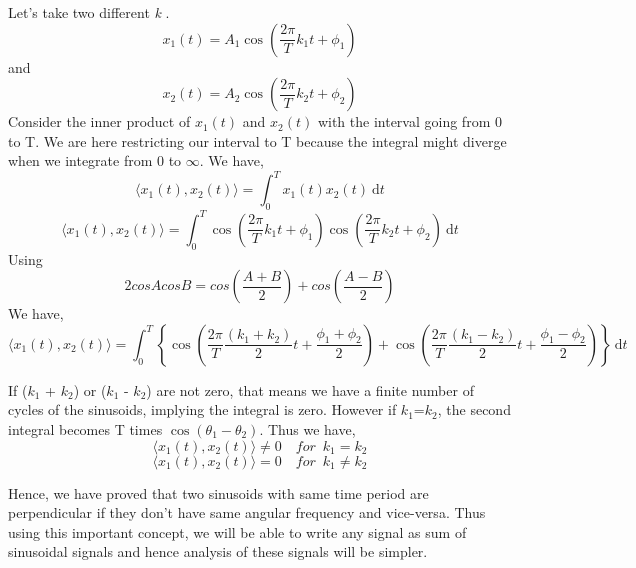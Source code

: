           Let's take two different \textit{k}
.  \begin{equation*}
x_1 (t) = A_1 \cos (\frac{2\pi}{T}k_1t + \phi_1)
\end{equation*}
           and \begin{equation*}
x_2 (t) = A_2 \cos (\frac{2\pi}{T}k_2t + \phi_2)
\end{equation*}
          Consider the inner product of $x_1(t)$ and $x_2(t)$ with the interval going from 0 to T. We are here restricting our interval to T because the integral might diverge when we integrate from 0 to $\infty$. We have,
           \begin{equation*}\langle x_1(t),x_2(t) \rangle = \int_{0}^{T} \! x_1(t)x_2(t) \ \mathrm{d}t\end{equation*}
           \begin{equation*}\langle x_1 (t),x_2 (t) \rangle = \int_{0}^{T} \! \cos (\frac{2\pi}{T}k_1t + \phi_1) \cos (\frac{2\pi}{T}k_2t + \phi_2) \ \mathrm{d}t\end{equation*}
           Using 
          \begin{equation*} 2cosAcosB = cos(\frac{A+B}{2}) + cos(\frac{A-B}{2})\end{equation*}
          We have,
          \begin{equation*}\langle x_1 (t),x_2 (t) \rangle = \int_{0}^{T} \! \left\lbrace \cos (\frac{2\pi}{T}\frac{(k_1+k_2)}{2}t + \frac{\phi_1+\phi_2}{2}) + \cos (\frac{2\pi}{T}\frac{(k_1-k_2)}{2}t + \frac{\phi_1-\phi_2}{2}) \right\rbrace \ \mathrm{d}t \end{equation*}
          
          
        
        
                
                If ($k_1$ + $k_2$) or ($k_1$ - $k_2$) are not zero, that means we have a finite number of cycles of the sinusoids, implying the integral is zero. However if $k_1$=$k_2$, the second integral becomes T times $\cos (\theta_1-\theta_2)$.
                Thus we have,
            \begin{equation*} \langle x_1 (t),x_2 (t) \rangle  \neq 0	\enspace \enspace		for \enspace k_1 = k_2\end{equation*}
            \begin{equation*} \langle x_1 (t),x_2 (t) \rangle = 0	\enspace \enspace		for \enspace k_1 \neq k_2\end{equation*}
                
                
                Hence, we have proved that two sinusoids with same time period are perpendicular if they don't have same angular frequency and vice-versa. Thus using this important concept, we will be able to write any signal as sum of sinusoidal signals and hence analysis of these signals will be simpler.

